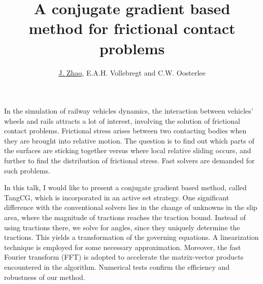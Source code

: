 \documentclass{article}
\title{A conjugate gradient based method for frictional contact problems}
\author{\underline{J. Zhao}, E.A.H. Vollebregt and C.W. Oosterlee}
\affil{Delft Universiry of Technology}
\date{}
\begin{document}
\maketitle

\setcounter{page}{9}
In the simulation of railway vehicles dynamics, the interaction between vehicles' wheels and rails attracts a lot of interest, involving the solution of frictional contact problems. Frictional stress arises between two contacting bodies when they are brought into relative motion. The question is to find out which parts of the surfaces are sticking together versus where local relative sliding occurs, and further to find the distribution of frictional stress. Fast solvers are demanded for such problems.


In this talk, I would like to present a conjugate gradient based method, called TangCG, which is incorporated in an active set strategy. One significant difference with the conventional solvers lies in the change of unknowns in the slip area, where the magnitude of tractions reaches the traction bound. Instead of using tractions there, we solve for angles, since they uniquely determine the tractions. This yields a transformation of the governing equations. A linearization technique is employed for some necessary approximation. Moreover, the fast Fourier transform (FFT) is adopted to accelerate the matrix-vector products encountered in the algorithm. Numerical tests confirm the efficiency and robustness of our method. 
\end{document}
